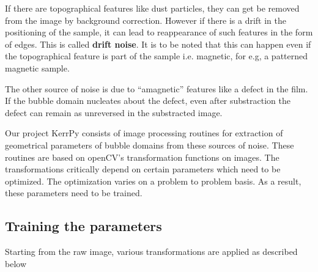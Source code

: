 \documentclass[12pt, twoside, a4paper]{article}
\begin{document}
If there are topographical features like dust particles, they can get be removed from the image by background correction. However if there is a drift in the positioning of the sample, it can lead to reappearance of such features in the form of edges. This is called \textbf{drift noise}. It is to be noted that this can happen even if the topographical feature is part of the sample i.e. magnetic, for e.g, a patterned magnetic sample.

The other source of noise is due to ``amagnetic'' features like a defect in the film. If the bubble domain nucleates about the defect, even after substraction the defect can remain as unreversed in the substracted image.

Our project KerrPy consists of image processing routines for extraction of geometrical parameters of bubble domains from these sources of noise. These routines are based on openCV's transformation functions on images. The transformations critically depend on certain parameters which need to be optimized. The optimization varies on a problem to problem basis. As a result, these parameters need to be trained.
\subsection{Training the parameters}
Starting from the raw image, various transformations are applied as described below
\end{document}
